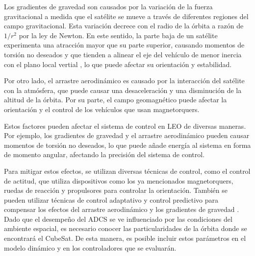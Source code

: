 Los gradientes de gravedad son causados por la variación de la fuerza gravitacional a medida que el satélite se mueve a través de diferentes regiones del campo gravitacional. Esta variación decrece con el radio de la órbita a razón de $1/r^2$ por la ley de Newton. En este sentido, la parte baja de un satélite experimenta una atracción mayor que su parte superior, causando momentos de torsión no deseados y que tienden a alinear el eje del vehículo de menor inercia con el plano local vertial \cite{griffin2004space}, lo que puede afectar su orientación y estabilidad.

Por otro lado, el arrastre aerodinámico es causado por la interacción del satélite con la atmósfera, que puede causar una desaceleración y una disminución de la altitud de la órbita. Por su parte, el campo geomagnético puede afectar la orientación y el control de los vehículos que usan magnetorquers.

Estos factores pueden afectar el sistema de control en LEO de diversas maneras. Por ejemplo, los gradientes de gravedad y el arrastre aerodinámico pueden causar momentos de torsión no deseados, lo que puede añade energía al sistema en forma de momento angular, afectando la precisión del sistema de control.
 
Para mitigar estos efectos, se utilizan diversas técnicas de control, como el control de actitud, que utiliza dispositivos como los ya mencionados magnetorquers, ruedas de reacción y propulsores para controlar la orientación. También se pueden utilizar técnicas de control adaptativo y control predictivo para compensar los efectos del arrastre aerodinámico y los gradientes de gravedad \cite{Junkins1997}.
Dado que el desempeño del ADCS se ve influenciado por las condiciones del ambiente espacial, es necesario conocer las particularidades de la órbita donde se encontrará el CubeSat. De esta manera, es posible incluir estos parámetros en el modelo dinámico y en los controladores que se evaluarán. 


